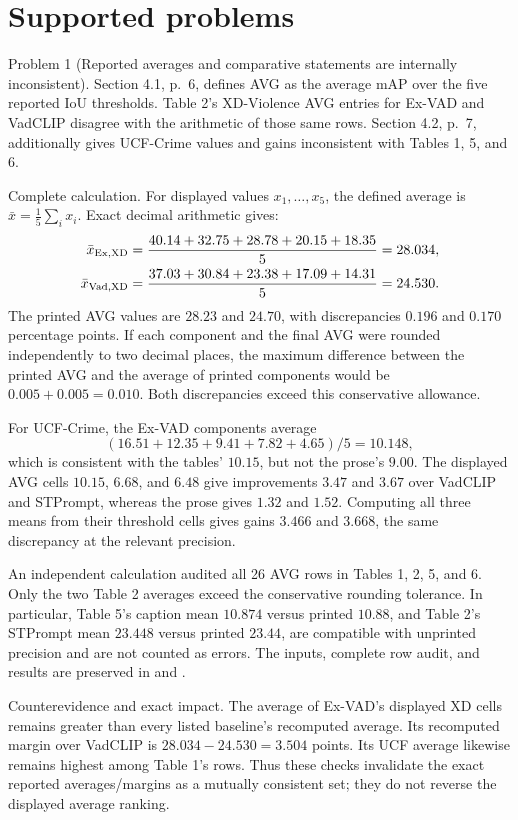 \documentclass[10pt]{article}
\begin{document}
\section*{Supported problems}
Problem 1 (Reported averages and comparative statements are internally inconsistent).  Section 4.1, p. 6, defines AVG as the average mAP over the five reported IoU thresholds. Table 2’s XD-Violence AVG entries for Ex-VAD and VadCLIP disagree with the arithmetic of those same rows. Section 4.2, p. 7, additionally gives UCF-Crime values and gains inconsistent with Tables 1, 5, and 6.\par
Complete calculation. For displayed values \(x_1,\ldots,x_5\), the defined average is \(\bar x=\frac15\sum_i x_i\). Exact decimal arithmetic gives: \[\begin{aligned}
 \bar x_{\rm Ex,XD}
 &=\frac{40.14+32.75+28.78+20.15+18.35}{5}
 =28.034,\\
 \bar x_{\rm Vad,XD}
 &=\frac{37.03+30.84+23.38+17.09+14.31}{5}
 =24.530.\end{aligned}\] The printed AVG values are \(28.23\) and \(24.70\), with discrepancies \(0.196\) and \(0.170\) percentage points. If each component and the final AVG were rounded independently to two decimal places, the maximum difference between the printed AVG and the average of printed components would be \(0.005+0.005=0.010\). Both discrepancies exceed this conservative allowance.\par
For UCF-Crime, the Ex-VAD components average \[(16.51+12.35+9.41+7.82+4.65)/5=10.148,\] which is consistent with the tables’ \(10.15\), but not the prose’s \(9.00\). The displayed AVG cells \(10.15\), \(6.68\), and \(6.48\) give improvements \(3.47\) and \(3.67\) over VadCLIP and STPrompt, whereas the prose gives \(1.32\) and \(1.52\). Computing all three means from their threshold cells gives gains \(3.466\) and \(3.668\), the same discrepancy at the relevant precision.\par
An independent calculation audited all 26 AVG rows in Tables 1, 2, 5, and 6. Only the two Table 2 averages exceed the conservative rounding tolerance. In particular, Table 5’s caption mean \(10.874\) versus printed \(10.88\), and Table 2’s STPrompt mean \(23.448\) versus printed \(23.44\), are compatible with unprinted precision and are not counted as errors. The inputs, complete row audit, and results are preserved in and .\par
Counterevidence and exact impact. The average of Ex-VAD’s displayed XD cells remains greater than every listed baseline’s recomputed average. Its recomputed margin over VadCLIP is \(28.034-24.530=3.504\) points. Its UCF average likewise remains highest among Table 1’s rows. Thus these checks invalidate the exact reported averages/margins as a mutually consistent set; they do not reverse the displayed average ranking.\par
\end{document}
